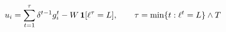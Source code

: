 
\color{ink}$\displaystyle
u_i=\sum_{t=1}^{\tau}\delta^{t-1}g_i^t-W\,\mathbf{1}[\ell^\tau=L],\qquad \tau=\min\{t:\ell^t=L\}\wedge T
$
